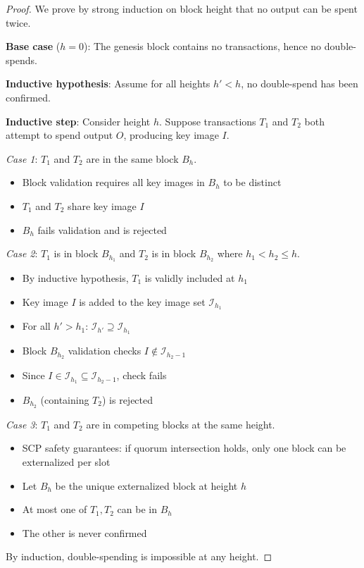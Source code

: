 \begin{proof}
We prove by strong induction on block height that no output can be spent
twice.

\textbf{Base case} ($h = 0$): The genesis block contains no transactions,
hence no double-spends.

\textbf{Inductive hypothesis}: Assume for all heights $h' < h$, no
double-spend has been confirmed.

\textbf{Inductive step}: Consider height $h$. Suppose transactions $T_1$
and $T_2$ both attempt to spend output $O$, producing key image $I$.

\textit{Case 1}: $T_1$ and $T_2$ are in the same block $B_h$.
\begin{itemize}
  \item Block validation requires all key images in $B_h$ to be distinct
  \item $T_1$ and $T_2$ share key image $I$
  \item $B_h$ fails validation and is rejected
\end{itemize}

\textit{Case 2}: $T_1$ is in block $B_{h_1}$ and $T_2$ is in block $B_{h_2}$
where $h_1 < h_2 \leq h$.
\begin{itemize}
  \item By inductive hypothesis, $T_1$ is validly included at $h_1$
  \item Key image $I$ is added to the key image set $\mathcal{I}_{h_1}$
  \item For all $h' > h_1$: $\mathcal{I}_{h'} \supseteq \mathcal{I}_{h_1}$
  \item Block $B_{h_2}$ validation checks $I \notin \mathcal{I}_{h_2-1}$
  \item Since $I \in \mathcal{I}_{h_1} \subseteq \mathcal{I}_{h_2-1}$, check fails
  \item $B_{h_2}$ (containing $T_2$) is rejected
\end{itemize}

\textit{Case 3}: $T_1$ and $T_2$ are in competing blocks at the same height.
\begin{itemize}
  \item SCP safety guarantees: if quorum intersection holds, only one block
    can be externalized per slot
  \item Let $B_h$ be the unique externalized block at height $h$
  \item At most one of $T_1, T_2$ can be in $B_h$
  \item The other is never confirmed
\end{itemize}

By induction, double-spending is impossible at any height.
\end{proof}

